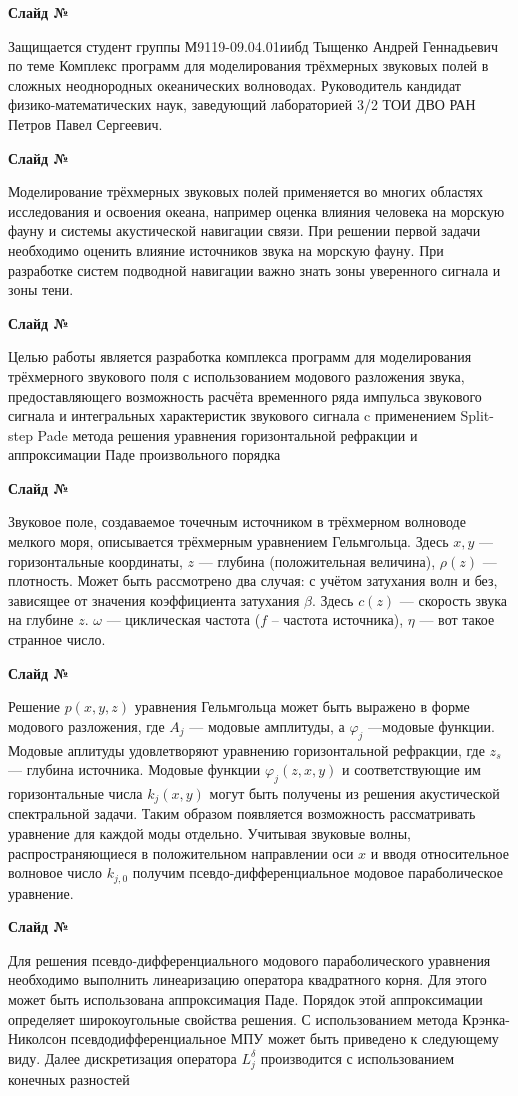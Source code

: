 \documentclass{fefu}
\newcounter{slide}
\newcommand{\slide}{\stepcounter{slide}\par\noindent\textbf{Слайд №\theslide}\par\noindent}
\newcommand{\pa}[1]{\left(#1\right)}
\begin{document}
    \slide
    Защищается студент группы М9119-09.04.01иибд Тыщенко Андрей Геннадьевич по теме Комплекс программ для моделирования трёхмерных звуковых полей в сложных неоднородных океанических волноводах. Руководитель кандидат физико-математических наук, заведующий лабораторией 3/2 ТОИ ДВО РАН Петров Павел Сергеевич.
    \slide
    Моделирование трёхмерных звуковых полей применяется во многих областях исследования и освоения океана, например оценка влияния человека на морскую фауну и системы акустической навигации связи. При решении первой задачи необходимо оценить влияние источников звука на морскую фауну. При разработке систем подводной навигации важно знать зоны уверенного сигнала и зоны тени.
    \slide
    Целью работы является разработка комплекса программ для моделирования трёхмерного звукового поля с использованием модового разложения звука, предоставляющего возможность расчёта временного ряда импульса звукового сигнала и интегральных характеристик звукового сигнала c применением Split-step Pade метода решения уравнения горизонтальной рефракции и аппроксимации Паде произвольного порядка
    \slide
    Звуковое поле, создаваемое точечным источником в трёхмерном волноводе мелкого моря, описывается трёхмерным уравнением Гельмгольца. Здесь $x,y$ --- горизонтальные координаты, $z$ --- глубина (положительная величина), $\rho\pa{z}$ --- плотность. Может быть рассмотрено два случая: с учётом затухания волн и без, зависящее от значения коэффициента затухания $\beta$. Здесь $c\pa{z}$ --- скорость звука на глубине $z$. $\omega$ --- циклическая частота ($f$ -- частота источника), $\eta$ --- вот такое странное число.
    \slide
    Решение $p\pa{x,y,z}$ уравнения Гельмгольца может быть выражено в форме модового разложения, где $A_j$ --- модовые амплитуды, а $\varphi_j$ ---модовые функции. Модовые аплитуды удовлетворяют уравнению горизонтальной рефракции, где $z_s$ --- глубина источника. Модовые функции $\varphi_j\pa{z,x,y}$ и соответствующие им горизонтальные числа $k_j(x,y)$ могут быть получены из решения акустической спектральной задачи. Таким образом появляется возможность рассматривать уравнение для каждой моды отдельно. Учитывая звуковые волны, распространяющиеся в положительном направлении оси $x$ и вводя относительное волновое число $k_{j,0}$ получим псевдо-дифференциальное модовое параболическое уравнение.
    \slide
    Для решения псевдо-дифференциального модового параболического уравнения необходимо выполнить линеаризацию оператора квадратного корня. Для этого может быть использована аппроксимация Паде. Порядок этой аппроксимации определяет широкоугольные свойства решения. С использованием метода Крэнка-Николсон псевдодифференциальное МПУ может быть приведено к следующему виду. Далее дискретизация оператора $L_j^\delta$ производится с использованием конечных разностей
\end{document}

